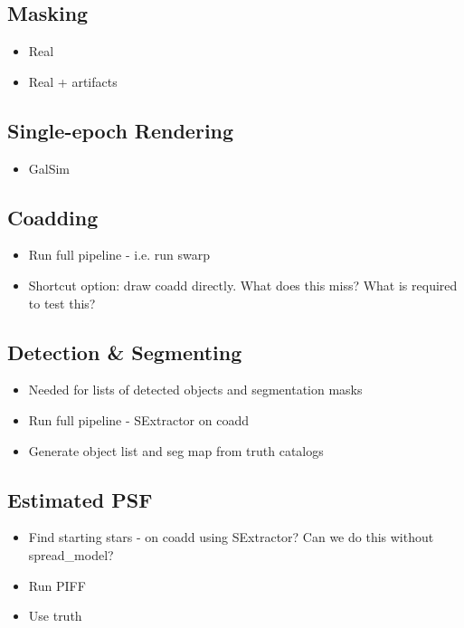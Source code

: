 \documentclass[\docopts]{\docclass}
\begin{document}
\subsection{Masking}

\begin{itemize}
\item Real
\item Real + artifacts
\end{itemize}

\subsection{Single-epoch Rendering}

\begin{itemize}
\item GalSim
\end{itemize}

\subsection{Coadding}
\begin{itemize}
\item{Run full pipeline - i.e. run swarp}
\item{Shortcut option: draw coadd directly. What does this miss? What is required to test this?}
\end{itemize}

\subsection{Detection \& Segmenting}
\begin{itemize}
\item Needed for lists of detected objects and segmentation masks
\item{Run full pipeline - SExtractor on coadd}
\item Generate object list and seg map from truth catalogs
\end{itemize}

\subsection{Estimated PSF}
\begin{itemize}
\item Find starting stars - on coadd using SExtractor? Can we do this without spread_model?
\item Run PIFF
\item Use truth
\end{itemize}
\end{document}
